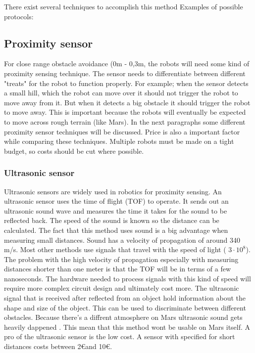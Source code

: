 \documentclass[10pt,a4paper]{article}
\begin{document}
There exist several techniques to accomplish this method 
Examples of possible protocols:


\newpage


\subsection{Proximity sensor}

For close range obstacle avoidance (0m - 0,3m, the robots will need some kind of proximity sensing technique. The sensor needs to differentiate between different "treats" for the robot to function properly. For example; when the sensor detects a small hill, which the robot can move over it should not trigger the robot to move away from it. But when it detects a big obstacle it should trigger the robot to move away. This is important because the robots will eventually be expected to move across rough terrain (like Mars). In the next paragraphs some different proximity sensor techniques will be discussed. Price is also a important factor while comparing these techniques. Multiple robots must be made on a tight budget, so costs should be cut where possible.\\


\subsubsection{Ultrasonic sensor}
Ultrasonic sensors are widely used in robotics for proximity sensing. An ultrasonic sensor uses the time of flight (TOF) to operate. It sends out an ultrasonic sound wave and measures the time it takes for the sound to be reflected back. The speed of the sound is known so the distance can be calculated. The fact that this method uses sound is a big advantage when measuring small distances. Sound has a velocity of propagation of around 340 m/s. Most other methods use signals that travel with the speed of light ( $3\cdot10^{8}$). The problem with the high velocity of  propagation especially with measuring distances shorter than one meter is that the TOF will be in terms of a few nanoseconds.  The hardware needed to process signals with this kind of speed will require more complex circuit design and ultimately cost more. The ultrasonic signal that is received after reflected from an object hold information about the shape and size of the object. This can be used to discriminate between different obstacles\cite{ultraobject}. Because there's a diffrent atmosphere on Mars ultrasonic sound gets heavily dappened \cite{soundonmars}. This mean that this method wont be usable on Mars itself. A pro of the ultrasonic sensor is the low cost. A sensor with specified for short distances costs between 2\euro and 10\euro.
\end{document}
